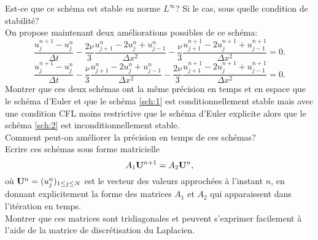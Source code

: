 \documentclass[12pt,a4paper]{article}
\begin{document}

 Est-ce que ce schéma est stable en norme $L^{\infty}$? Si le cas, sous quelle condition de stabilité? \\ %



 On propose maintenant deux améliorations possibles de ce schéma:
\begin{equation}\label{sch:1}
\frac{u_j^{n+1}-u_j^n}{\Delta t}-\frac{2\nu}{3} \frac{u_{j+1}^{n}-2u_j^n+u_{j-1}^{n}}{\Delta x^2}-\frac{\nu}{3} \frac{u_{j+1}^{n+1}-2u_j^{n+1}+u_{j-1}^{n+1}}{\Delta x^2}=0.
\end{equation}
\begin{equation}\label{sch:2}
\frac{u_j^{n+1}-u_j^n}{\Delta t}-\frac{\nu}{3} \frac{u_{j+1}^{n}-2u_j^n+u_{j-1}^{n}}{\Delta x^2}-\frac{2\nu}{3} \frac{u_{j+1}^{n+1}-2u_j^{n+1}+u_{j-1}^{n+1}}{\Delta x^2}=0.
\end{equation}
Montrer que ces deux schémas ont la même précision en temps et en espace que le schéma d'Euler et que le schéma \eqref{sch:1} est conditionnellement stable mais avec une condition CFL moins restrictive que le schéma d'Euler explicite alors que le schéma \eqref{sch:2} est inconditionnellement stable. \\

\noindent Comment peut-on améliorer la précision en temps de ces schémas? \\%



 Ecrire ces schémas sous forme matricielle 
$$
A_1 {\bf U}^{n+1} = A_2 {\bf U}^{n},
$$
où ${\bf U}^{n} = (u_j^n )_{1\le j \le N}$ est le vecteur des valeurs approchées à l'instant $n$, en donnant explicitement la forme des matrices $A_1$  et $A_2$ qui apparaissent dans l'itération en temps. \\

\noindent Montrer que ces matrices sont tridiagonales et peuvent s'exprimer  facilement à l'aide de la matrice de discrétisation du Laplacien. %
\end{document}
